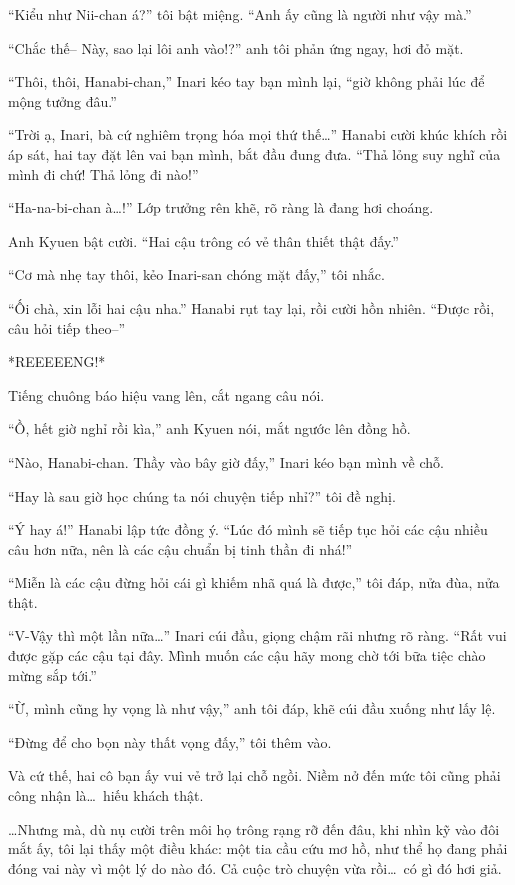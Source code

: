 \documentclass[../main.tex]{subfiles}
\begin{document}
``Kiểu như Nii-chan á?'' tôi bật miệng. ``Anh ấy cũng là người như vậy mà.''

``Chắc thế-- Này, sao lại lôi anh vào!?'' anh tôi phản ứng ngay, hơi đỏ mặt.

``Thôi, thôi, Hanabi-chan,'' Inari kéo tay bạn mình lại, ``giờ không phải lúc để mộng tưởng đâu.''

``Trời ạ, Inari, bà cứ nghiêm trọng hóa mọi thứ thế\dots'' Hanabi cười khúc khích rồi áp sát, hai tay đặt lên vai bạn mình, bắt đầu đung đưa. ``Thả lỏng suy nghĩ của mình đi chứ! Thả lỏng đi nào!''

``Ha-na-bi-chan à\dots!'' Lớp trưởng rên khẽ, rõ ràng là đang hơi choáng.

Anh Kyuen bật cười. ``Hai cậu trông có vẻ thân thiết thật đấy.''

``Cơ mà nhẹ tay thôi, kẻo Inari-san chóng mặt đấy,'' tôi nhắc.

``Ối chà, xin lỗi hai cậu nha.'' Hanabi rụt tay lại, rồi cười hồn nhiên. ``Được rồi, câu hỏi tiếp theo--''

*REEEEENG!*

Tiếng chuông báo hiệu vang lên, cắt ngang câu nói.

``Ồ, hết giờ nghỉ rồi kìa,'' anh Kyuen nói, mắt ngước lên đồng hồ.

``Nào, Hanabi-chan. Thầy vào bây giờ đấy,'' Inari kéo bạn mình về chỗ.

``Hay là sau giờ học chúng ta nói chuyện tiếp nhỉ?'' tôi đề nghị.

``Ý hay á!'' Hanabi lập tức đồng ý. ``Lúc đó mình sẽ tiếp tục hỏi các cậu nhiều câu hơn nữa, nên là các cậu chuẩn bị tinh thần đi nhá!''

``Miễn là các cậu đừng hỏi cái gì khiếm nhã quá là được,'' tôi đáp, nửa đùa, nửa thật.

``V-Vậy thì một lần nữa\dots'' Inari cúi đầu, giọng chậm rãi nhưng rõ ràng. ``Rất vui được gặp các cậu tại đây. Mình muốn các cậu hãy mong chờ tới bữa tiệc chào mừng sắp tới.''

``Ừ, mình cũng hy vọng là như vậy,'' anh tôi đáp, khẽ cúi đầu xuống như lấy lệ.

``Đừng để cho bọn này thất vọng đấy,'' tôi thêm vào.

Và cứ thế, hai cô bạn ấy vui vẻ trở lại chỗ ngồi. Niềm nở đến mức tôi cũng phải công nhận là\dots\ hiếu khách thật.

\dots Nhưng mà, dù nụ cười trên môi họ trông rạng rỡ đến đâu, khi nhìn kỹ vào đôi mắt ấy, tôi lại thấy một điều khác: một tia cầu cứu mơ hồ, như thể họ đang phải đóng vai này vì một lý do nào đó. Cả cuộc trò chuyện vừa rồi\dots\ có gì đó hơi giả.
\end{document}
